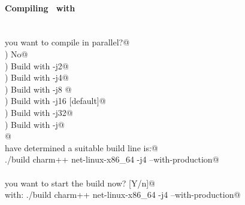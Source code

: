 \begin{frame}[fragile] 
\secframetitle{\ssInstallCharm}
\framesubtitle{Compiling \charm\ with }
\color{black}
\footnotesize
\ \\
\verb@Do you want to compile in parallel?@ \\
) No@ \\
) Build with -j2@ \\
) Build with -j4@ \\
) Build with -j8 @ \\
) Build with -j16 [default]@ \\
) Build with -j32@ \\
) Build with -j@ \\
\verb@  @
\ \\
\pause
\verb@We have determined a suitable build line is:@ \\
\verb@	./build charm++ net-linux-x86_64  -j4  --with-production@ \\
\ \\
\verb@Do you want to start the build now? [Y/n]@ \pause{}\\
\verb@Building with: ./build charm++ net-linux-x86_64  -j4 --with-production@

\end{frame}



